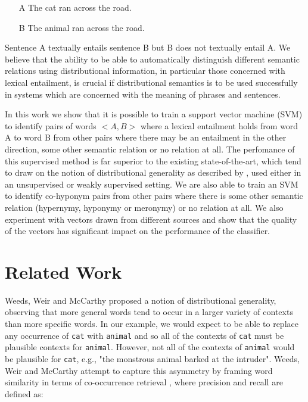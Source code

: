 \documentclass[11pt]{article}
\begin{document}
\begin{itemize}
\item[A]{The cat ran across the road.}
\item[B]{The animal ran across the road.}
\end{itemize}

Sentence A textually entails sentence B but B does not textually entail A.  We believe that the ability to be able to automatically distinguish different semantic relations using distributional information, in particular those concerned with lexical entailment, is crucial if distributional semantics is to be used successfully in systems which are concerned with the meaning of phrases and sentences.

In this work we show that it is possible to train a support vector machine (SVM) to identify pairs of words $<A,B>$ where a lexical entailment holds from word A to word B from other pairs where there may be an entailment in the other direction, some other semantic relation or no relation at all.  The perfomance of this supervised method is far superior to the existing state-of-the-art, which tend to draw on the notion of distributional generality as described by \cite{Weeds2004}, used either in an unsupervised or weakly supervised setting.  We are also able to train an SVM to identify co-hyponym pairs from other pairs where there is some other semantic relation (hypernymy, hyponymy or meronymy) or no relation at all.  We also experiment with vectors drawn from different sources and show that the quality of the vectors has significant impact on the performance of the classifier.  

\section{Related Work}

Weeds, Weir and McCarthy  proposed a notion of distributional generality, observing that more general words tend to occur in a larger variety of contexts than more specific words.  In our example, we would expect to be able to replace any occurrence of \texttt{cat} with \texttt{animal} and so all of the contexts of \texttt{cat} must be plausible contexts for \texttt{animal}.  However, not all of the contexts of \texttt{animal} would be plausible for \texttt{cat}, e.g., "the monstrous animal barked at the intruder".  Weeds, Weir and McCarthy attempt to capture this asymmetry by framing word similarity in terms of co-occurrence retrieval \cite{Weeds2003}, where precision and recall are defined as:
\end{document}
